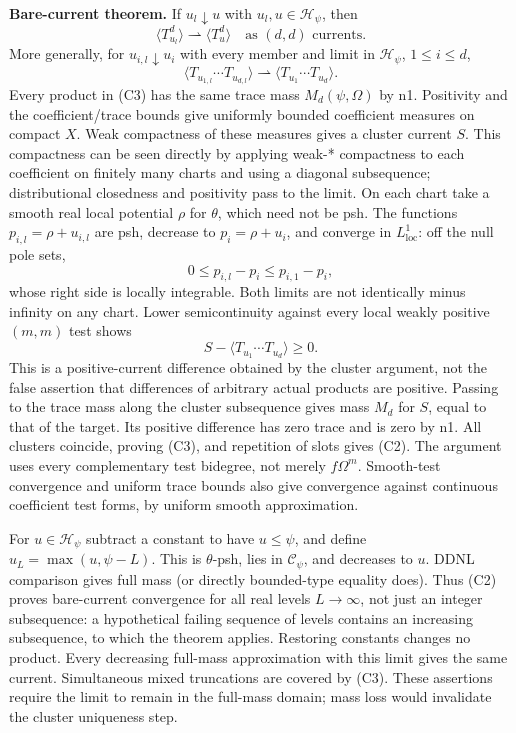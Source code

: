 \documentclass[
  11pt,
]{article}
\begin{document}
\textbf{Bare-current theorem.} If \(u_l\downarrow u\) with
\(u_l,u\in\mathcal H_\psi\), then \[
\langle T_{u_l}^d\rangle\rightharpoonup\langle T_u^d\rangle
\quad\text{as }(d,d)\text{ currents}. \tag{C2}
\] More generally, for \(u_{i,l}\downarrow u_i\) with every member and
limit in \(\mathcal H_\psi\), \(1\leq i\leq d\), \[
\langle T_{u_{1,l}}\cdots T_{u_{d,l}}\rangle
\rightharpoonup\langle T_{u_1}\cdots T_{u_d}\rangle. \tag{C3}
\] Every product in (C3) has the same trace mass \(M_d(\psi,\Omega)\) by
n1. Positivity and the coefficient/trace bounds give uniformly bounded
coefficient measures on compact \(X\). Weak compactness of these
measures gives a cluster current \(S\). This compactness can be seen
directly by applying weak-* compactness to each coefficient on finitely
many charts and using a diagonal subsequence; distributional closedness
and positivity pass to the limit. On each chart take a smooth real local
potential \(\rho\) for \(\theta\), which need not be psh. The functions
\(p_{i,l}=\rho+u_{i,l}\) are psh, decrease to \(p_i=\rho+u_i\), and
converge in \(L^1_{\mathrm{loc}}\): off the null pole sets, \[
0\leq p_{i,l}-p_i\leq p_{i,1}-p_i,
\] whose right side is locally integrable. Both limits are not
identically minus infinity on any chart. Lower semicontinuity against
every local weakly positive \((m,m)\) test shows \[
S-\langle T_{u_1}\cdots T_{u_d}\rangle\geq0.
\] This is a positive-current difference obtained by the cluster
argument, not the false assertion that differences of arbitrary actual
products are positive. Passing to the trace mass along the cluster
subsequence gives mass \(M_d\) for \(S\), equal to that of the target.
Its positive difference has zero trace and is zero by n1. All clusters
coincide, proving (C3), and repetition of slots gives (C2). The argument
uses every complementary test bidegree, not merely \(f\Omega^m\).
Smooth-test convergence and uniform trace bounds also give convergence
against continuous coefficient test forms, by uniform smooth
approximation.

For \(u\in\mathcal H_\psi\) subtract a constant to have \(u\leq\psi\),
and define \(u_L=\max(u,\psi-L)\). This is \(\theta\)-psh, lies in
\(\mathcal C_\psi\), and decreases to \(u\). DDNL comparison gives full
mass (or directly bounded-type equality does). Thus (C2) proves
bare-current convergence for all real levels \(L\to\infty\), not just an
integer subsequence: a hypothetical failing sequence of levels contains
an increasing subsequence, to which the theorem applies. Restoring
constants changes no product. Every decreasing full-mass approximation
with this limit gives the same current. Simultaneous mixed truncations
are covered by (C3). These assertions require the limit to remain in the
full-mass domain; mass loss would invalidate the cluster uniqueness
step.
\end{document}
